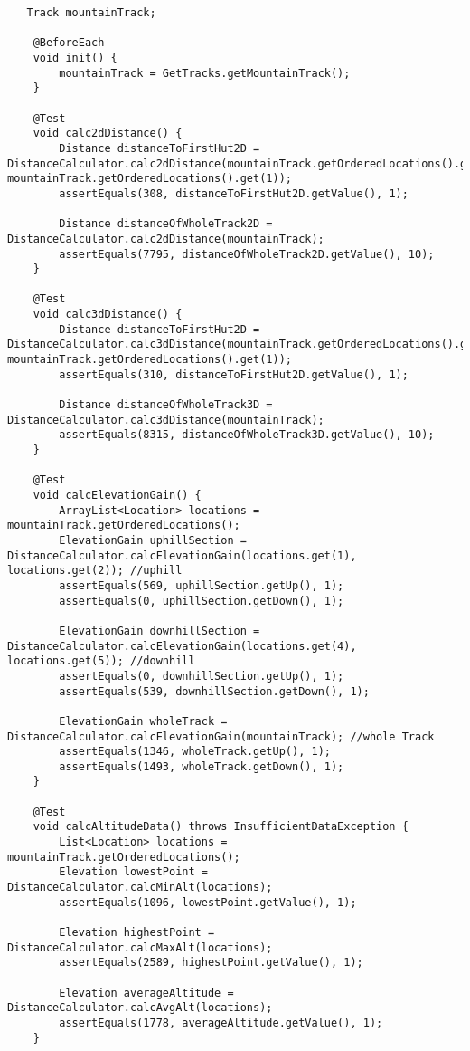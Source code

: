 \begin{lstlisting}
   Track mountainTrack;

    @BeforeEach
    void init() {
        mountainTrack = GetTracks.getMountainTrack();
    }

    @Test
    void calc2dDistance() {
        Distance distanceToFirstHut2D = DistanceCalculator.calc2dDistance(mountainTrack.getOrderedLocations().get(0), mountainTrack.getOrderedLocations().get(1));
        assertEquals(308, distanceToFirstHut2D.getValue(), 1);

        Distance distanceOfWholeTrack2D = DistanceCalculator.calc2dDistance(mountainTrack);
        assertEquals(7795, distanceOfWholeTrack2D.getValue(), 10);
    }

    @Test
    void calc3dDistance() {
        Distance distanceToFirstHut2D = DistanceCalculator.calc3dDistance(mountainTrack.getOrderedLocations().get(0), mountainTrack.getOrderedLocations().get(1));
        assertEquals(310, distanceToFirstHut2D.getValue(), 1);

        Distance distanceOfWholeTrack3D = DistanceCalculator.calc3dDistance(mountainTrack);
        assertEquals(8315, distanceOfWholeTrack3D.getValue(), 10);
    }

    @Test
    void calcElevationGain() {
        ArrayList<Location> locations = mountainTrack.getOrderedLocations();
        ElevationGain uphillSection = DistanceCalculator.calcElevationGain(locations.get(1), locations.get(2)); //uphill
        assertEquals(569, uphillSection.getUp(), 1);
        assertEquals(0, uphillSection.getDown(), 1);

        ElevationGain downhillSection = DistanceCalculator.calcElevationGain(locations.get(4), locations.get(5)); //downhill
        assertEquals(0, downhillSection.getUp(), 1);
        assertEquals(539, downhillSection.getDown(), 1);

        ElevationGain wholeTrack = DistanceCalculator.calcElevationGain(mountainTrack); //whole Track
        assertEquals(1346, wholeTrack.getUp(), 1);
        assertEquals(1493, wholeTrack.getDown(), 1);
    }

    @Test
    void calcAltitudeData() throws InsufficientDataException {
        List<Location> locations = mountainTrack.getOrderedLocations();
        Elevation lowestPoint = DistanceCalculator.calcMinAlt(locations);
        assertEquals(1096, lowestPoint.getValue(), 1);

        Elevation highestPoint = DistanceCalculator.calcMaxAlt(locations);
        assertEquals(2589, highestPoint.getValue(), 1);

        Elevation averageAltitude = DistanceCalculator.calcAvgAlt(locations);
        assertEquals(1778, averageAltitude.getValue(), 1);
    }
\end{lstlisting}

